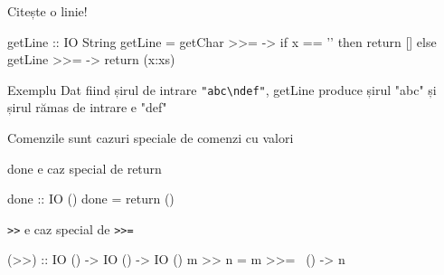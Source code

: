 \documentclass[xcolor=pdftex,romanian,colorlinks]{beamer}
\begin{document}
\begin{frame}[fragile]{Citește o linie!}
\begin{asciihs}
   getLine :: IO String
   getLine = getChar >>= \x ->
              if x == '\n' then
                return []
              else
                getLine >>= \xs ->
                return (x:xs)
\end{asciihs}

\begin{block}
{Exemplu}
Dat fiind șirul de intrare \lstinline$"abc\ndef"$, getLine produce șirul "abc" și șirul rămas de intrare e "def"
\end{block}
\end{frame}

\begin{frame}[fragile]{Comenzile sunt cazuri speciale de comenzi cu valori}
\begin{block}{done e caz special de return}
\begin{asciihs}
   done      :: IO ()
   done      = return ()
\end{asciihs}
\end{block}
\begin{block}{\lstinline$>>$ e caz special de \lstinline$>>=$ }
\begin{asciihs}
   (>>)      :: IO () -> IO () -> IO ()
   m >> n    = m >>= \ () -> n
\end{asciihs}
\end{block}
\end{frame}
\end{document}
